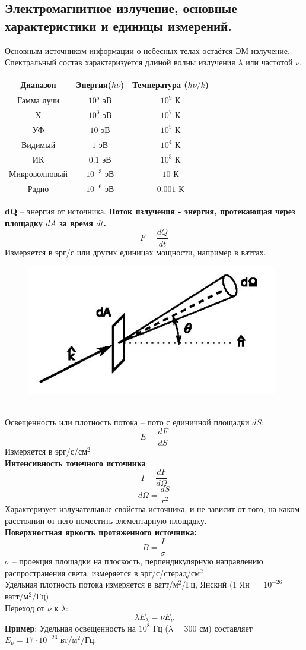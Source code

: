 \documentclass[12pt]{article}
\begin{document}
	
	
	\subsection{Электромагнитное излучение, основные характеристики и единицы измерений.}
	
	Основным источником информации о небесных телах остаётся ЭМ излучение.
	Спектральный состав характеризуется длиной волны
	излучения $\lambda$ или частотой $\nu$.
	
	\begin{center}
		\begin{tabular}{||c c c||} 
			\hline
			Диапазон & Энергия($h\nu$) &Температура ($h\nu/k$) \\ [0.5ex] 
			\hline\hline
			Гамма лучи & $10^5$ эВ& $10^9$ К  \\ 
			\hline
			X & $10^3$ эВ& $10^7$ К  \\
			\hline
			УФ & $10$ эВ& $10^5$ К  \\
			\hline
			Видимый & $1$ эВ& $10^4$ К  \\
			\hline
			ИК & $0.1$ эВ& $10^3$ К   \\
			\hline
			Микроволновый & $10^{-3}$ эВ& $10$ К   \\
			\hline
			Радио & $10^{-6}$ эВ& $0.001$ К   \\
			\hline
		\end{tabular}
	\end{center}
	\textbf{dQ} -- энергия от источника.
	\textbf{Поток излучения - энергия, протекающая через площадку $dA$ за время $dt$.}
	$$F = \frac{dQ}{dt}$$ 	Измеряется в эрг/с или других единицах мощности, например в
	ваттах.
\begin{figure}[h]
	\centering
	\includegraphics[width=0.3\linewidth]{"111"}
\end{figure}\\
	Освещенность или плотность потока -- пото с единичной площадки $dS$:
	$$E = \frac{dF}{dS}$$ Измеряется в эрг/с/см$^2$\\
	\textbf{Интенсивность точечного источника}
	$$I = \frac{dF}{d\Omega}$$
	$$d\Omega = \frac{dS}{r^2}$$
	Характеризует излучательные свойства источника, и не зависит от того, на каком расстоянии от него поместить элементарную площадку.	\\
	\textbf{Поверхностная яркость протяженного источника:}
	$$B = \frac{I}{\sigma}$$
	$\sigma$ -- проекция площадки на плоскость, перпендикулярную направлению распространения света, измеряется в эрг/с/стерад/см$^2$\\
	Удельная плотность потока измеряется в ватт/м$^2$/Гц, Янский (1 Ян $= 10^{-26}$ ватт/м$^2$/Гц)\\
	Переход от $\nu$ к $\lambda$:
	$$\lambda E_{\lambda}= \nu E_{\nu}$$
	\textbf{Пример}:
	Удельная освещенность на $10^8$ Гц ($\lambda = 300$ см)
	составляет $E_{\nu}	= 17\cdot10^{-23}$ вт/м$^2$/Гц.
\end{document}
